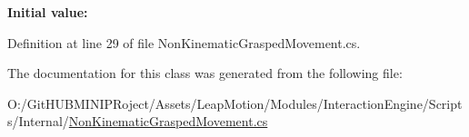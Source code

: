 {\bfseries Initial value\+:}
\begin{DoxyCode}{0}

\end{DoxyCode}


Definition at line 29 of file Non\+Kinematic\+Grasped\+Movement.\+cs.



The documentation for this class was generated from the following file\+:\begin{DoxyCompactItemize}
\item 
O\+:/\+Git\+H\+U\+B\+M\+I\+N\+I\+P\+Roject/\+Assets/\+Leap\+Motion/\+Modules/\+Interaction\+Engine/\+Scripts/\+Internal/\mbox{\hyperlink{_non_kinematic_grasped_movement_8cs}{Non\+Kinematic\+Grasped\+Movement.\+cs}}\end{DoxyCompactItemize}
